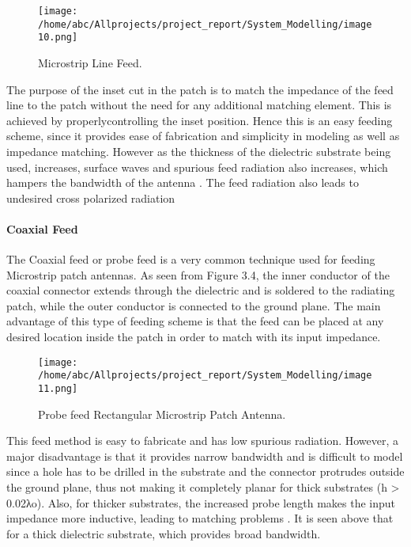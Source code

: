\documentclass[12pt]{article}
\begin{document}
				                    \begin{figure}[H]
				                    	\centering
				                    	\texttt{[image: /home/abc/Allprojects/project\_report/System\_Modelling/image10.png]}
				                    	\caption{Microstrip Line Feed.}	             	
				                    \end{figure}
				                    
				                    
					               	The purpose of the inset cut in the patch is to match the impedance of the feed line to the patch without the need for any additional matching element. This is achieved by properlycontrolling the inset position. Hence this is an easy feeding scheme, since it provides ease of fabrication and simplicity in modeling as well as impedance matching. However as the thickness of the dielectric substrate being used, increases, surface waves and spurious feed radiation also increases, which hampers the bandwidth of the antenna . The feed radiation also leads to undesired cross polarized radiation
					               \paragraph{ Coaxial Feed}
					                \justify
					                
					                
					                  The Coaxial feed or probe feed is a very common technique used for feeding Microstrip patch antennas. As seen from Figure 3.4, the inner conductor of the coaxial connector extends through the dielectric and is soldered to the radiating patch, while the outer conductor is connected to the ground plane. The main advantage of this type of feeding scheme is that the feed can be placed at any desired location inside the patch in order to match with its input impedance.
					                     \begin{figure}[H]
					                     	\centering
					                     	\texttt{[image: /home/abc/Allprojects/project\_report/System\_Modelling/image11.png]}
					                     	\caption{Probe feed Rectangular Microstrip Patch Antenna. }	             	
					                     \end{figure}
					                   This feed method is easy to fabricate and has low spurious radiation. However, a major disadvantage is that it provides narrow bandwidth and is difficult to model since a hole has to be drilled in the substrate and the connector protrudes outside the ground plane, thus not making it completely planar for thick substrates (h > 0.02λo). Also, for thicker substrates, the increased probe length makes the input impedance more inductive, leading to matching problems . It is seen above that for a thick dielectric substrate, which provides broad bandwidth.
					                   
\end{document}
